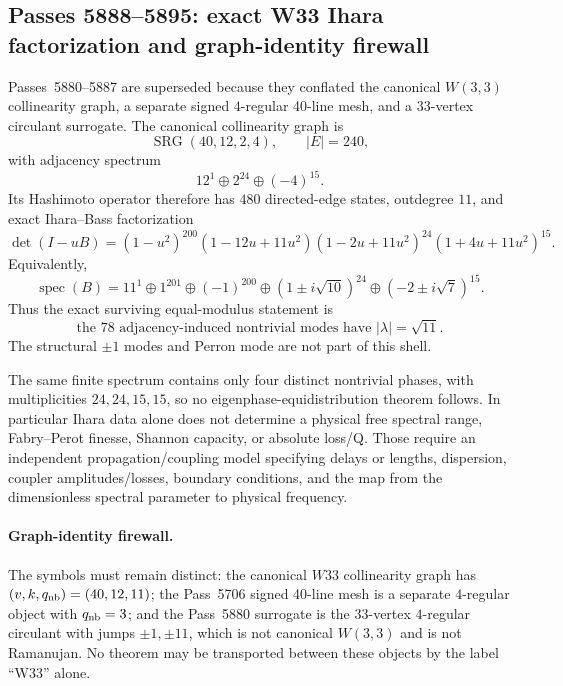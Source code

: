 \subsection*{Passes 5888--5895: exact W33 Ihara factorization and graph-identity firewall}

Passes~5880--5887 are superseded because they conflated the canonical
$W(3,3)$ collinearity graph, a separate signed $4$-regular 40-line mesh, and a
33-vertex circulant surrogate.  The canonical collinearity graph is
\[
  \operatorname{SRG}(40,12,2,4),\qquad |E|=240,
\]
with adjacency spectrum
\[
  12^1\oplus 2^{24}\oplus(-4)^{15}.
\]
Its Hashimoto operator therefore has $480$ directed-edge states, outdegree
$11$, and exact Ihara--Bass factorization
\[
\det(I-uB)=
(1-u^2)^{200}
(1-12u+11u^2)
(1-2u+11u^2)^{24}
(1+4u+11u^2)^{15}.
\]
Equivalently,
\[
\operatorname{spec}(B)=
11^1\oplus 1^{201}\oplus(-1)^{200}
\oplus(1\pm i\sqrt{10})^{24}
\oplus(-2\pm i\sqrt7)^{15}.
\]
Thus the exact surviving equal-modulus statement is
\[
\boxed{\text{the 78 adjacency-induced nontrivial modes have }|\lambda|=\sqrt{11}.}
\]
The structural $\pm1$ modes and Perron mode are not part of this shell.

The same finite spectrum contains only four distinct nontrivial phases, with
multiplicities $24,24,15,15$, so no eigenphase-equidistribution theorem follows.
In particular Ihara data alone does not determine a physical free spectral
range, Fabry--Perot finesse, Shannon capacity, or absolute loss/Q.  Those require
an independent propagation/coupling model specifying delays or lengths,
dispersion, coupler amplitudes/losses, boundary conditions, and the map from the
dimensionless spectral parameter to physical frequency.

\paragraph{Graph-identity firewall.}
The symbols must remain distinct: the canonical $W33$ collinearity graph has
$(v,k,q_{\rm nb})=(40,12,11)$; the Pass~5706 signed 40-line mesh is a separate
$4$-regular object with $q_{\rm nb}=3$; and the Pass~5880 surrogate is the
33-vertex $4$-regular circulant with jumps $\pm1,\pm11$, which is not canonical
$W(3,3)$ and is not Ramanujan.  No theorem may be transported between these
objects by the label ``W33'' alone.
